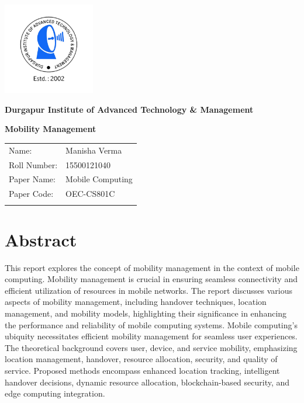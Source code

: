 \documentclass[12pt]{report}
\begin{document}
\begin{titlepage}
    \centering
    \includegraphics[width=4cm]{transparent logo.png}

    \Large \textbf{Durgapur Institute of Advanced Technology \& Management}
    \vspace{6cm}

    \Large \textbf{Mobility Management}\par
    \vspace{1cm}
    
    \large
    \begin{tabular}{l l}
        Name: & Manisha Verma \\
        Roll Number: & 15500121040 \\
        Paper Name: & Mobile Computing \\
        Paper Code: & OEC-CS801C \\ \\
    \end{tabular}
\end{titlepage}

\tableofcontents

\newpage
\section*{Abstract}
This report explores the concept of mobility management in the context of mobile computing. Mobility management is crucial in ensuring seamless connectivity and efficient utilization of resources in mobile networks. The report discusses various aspects of mobility management, including handover techniques, location management, and mobility models, highlighting their significance in enhancing the performance and reliability of mobile computing systems. Mobile computing's ubiquity necessitates efficient mobility management for seamless user experiences. The theoretical background covers user, device, and service mobility, emphasizing location management, handover, resource allocation, security, and quality of service. Proposed methods encompass enhanced location tracking, intelligent handover decisions, dynamic resource allocation, blockchain-based security, and edge computing integration.
\end{document}
